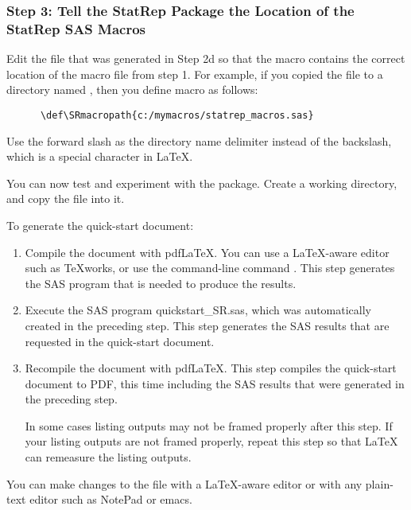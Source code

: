 \documentclass[article,oneside]{memoir}
\begin{document}
\subsubsection{Step 3: Tell the StatRep Package the Location of the StatRep SAS Macros}

   Edit the  file that was generated in Step 2d so that the macro
    contains
   the correct location of the macro file from step 1. For example, if
   you copied the  file to a directory named
   ,
   then you define macro  as follows:
   \begin{verbatim}
      \def\SRmacropath{c:/mymacros/statrep_macros.sas}
   \end{verbatim}

   Use the forward slash
   as the directory name delimiter instead of the backslash, which is a special
   character in LaTeX.

   You can now test and experiment with the package. Create a working
   directory, and copy the file  into it.

   To generate the quick-start document:
\begin{enumerate}
\item Compile the document with pdf\LaTeX. You can use a \LaTeX-aware
      editor such as \TeX works, or use the command-line command .
      This step generates the SAS program that is needed to produce the results.

\item Execute the SAS program quickstart\_SR.sas, which was automatically
      created in the preceding step. This step generates the SAS
      results that are requested in the quick-start document.


\item Recompile the document with pdf\LaTeX. This step compiles the
      quick-start document to PDF, this time including the SAS results
      that were generated in the preceding step.

      In some cases listing outputs may not be framed properly after this step.
      If your listing outputs are not framed properly, repeat this step so that
      LaTeX can remeasure the listing outputs.

\end{enumerate}
   You can make changes to the file with a \LaTeX-aware editor
   or with any plain-text editor such as \textsf{NotePad} or \textsf{emacs}.
\end{document}
